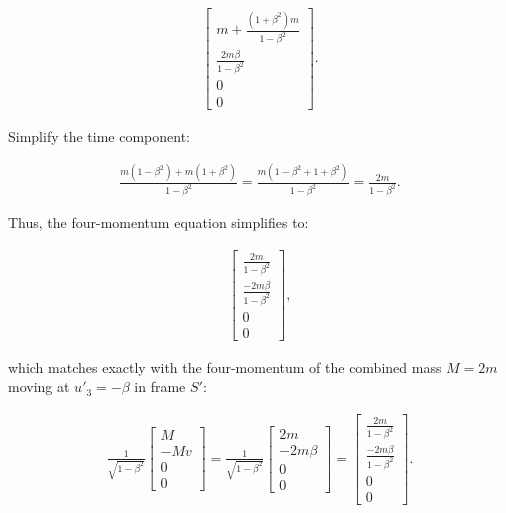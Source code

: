 \documentclass[12pt]{memoir}
\begin{document}
        \begin{align}
        \begin{bmatrix}
            m + \frac{(1 + \beta^2)m}{1 - \beta^2} \\
            \frac{2m\beta}{1 - \beta^2} \\
            0 \\
            0
        \end{bmatrix}.
        \end{align}
        
        Simplify the time component:
        
        \begin{align}
        \frac{m(1 - \beta^2) + m(1 + \beta^2)}{1 - \beta^2} = \frac{m(1 - \beta^2 + 1 + \beta^2)}{1 - \beta^2} = \frac{2m}{1 - \beta^2}.
        \end{align}
        
        Thus, the four-momentum equation simplifies to:
        
        \begin{align}
        \begin{bmatrix}
            \frac{2m}{1 - \beta^2} \\
            \frac{-2m\beta}{1 - \beta^2} \\
            0 \\
            0
        \end{bmatrix},
        \end{align}
        
        which matches exactly with the four-momentum of the combined mass \( M = 2m \) moving at \( u'_3 = -\beta \) in frame \( S' \):
        
        \begin{align}
        \frac{1}{\sqrt{1 - \beta^2}}
        \begin{bmatrix}
            M \\
            -Mv \\
            0 \\
            0
        \end{bmatrix}
        =
        \frac{1}{\sqrt{1 - \beta^2}}
        \begin{bmatrix}
            2m \\
            -2m\beta \\
            0 \\
            0
        \end{bmatrix}
        =
        \begin{bmatrix}
            \frac{2m}{1 - \beta^2} \\
            \frac{-2m\beta}{1 - \beta^2} \\
            0 \\
            0
        \end{bmatrix}.
        \end{align}
\end{document}
